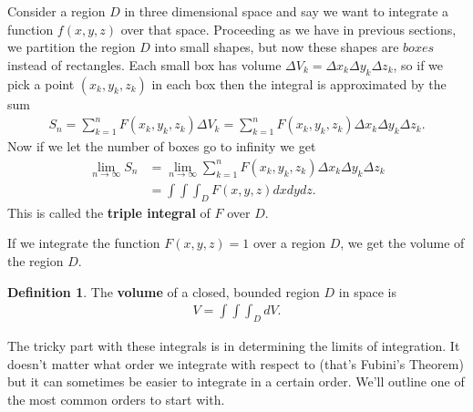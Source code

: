 \documentclass[12pt, letter]{article}
\theoremstyle{plain}
\numberwithin{theorem}{section}
\theoremstyle{definition}
\newtheorem{definition}[theorem]{Definition}
\begin{document}
Consider a region $D$ in three dimensional space and say we want to integrate a function $f(x,y,z)$ over that space. Proceeding as we have in previous sections, we partition the region $D$ into small shapes, but now these shapes are $\textit{boxes}$ instead of rectangles. Each small box has volume $\Delta V_k = \Delta x_k \Delta y_k \Delta z_k$, so if we pick a point $(x_k,y_k,z_k)$ in each box then the integral is approximated by the sum
\begin{align*}
S_n = \sum_{k=1}^n F(x_k,y_k,z_k) \Delta V_k = \sum_{k=1}^n F(x_k,y_k,z_k) \Delta x_k \Delta y_k \Delta z_k.
\end{align*}
Now if we let the number of boxes go to infinity we get
\begin{align*}
\lim_{n\to\infty} S_n &= \lim_{n\to\infty} \sum_{k=1}^n F(x_k,y_k,z_k) \Delta x_k \Delta y_k \Delta z_k\\
&= \int \int \int_D F(x,y,z) dxdydz.
\end{align*}
This is called the \textbf{triple integral} of $F$ over $D$.

\bigskip

\hrulefill

\bigskip

If we integrate the function $F(x,y,z) = 1$ over a region $D$, we get the volume of the region $D$.

\bigskip

\begin{definition}
The \textbf{volume} of a closed, bounded region $D$ in space is
\begin{align*}
V= \int \int \int_D dV.
\end{align*}
\end{definition}

\bigskip

\hrulefill

\bigskip

The tricky part with these integrals is in determining the limits of integration. It doesn't matter what order we integrate with respect to (that's Fubini's Theorem) but it can sometimes be easier to integrate in a certain order. We'll outline one of the most common orders to start with.

\bigskip
\end{document}
